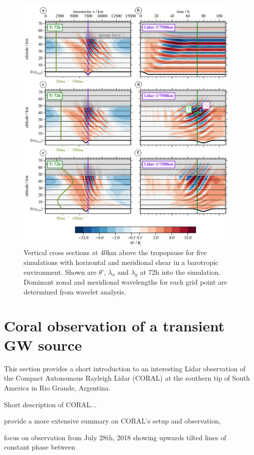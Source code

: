 \begin{figure}[tbp]
    \centering
    \includegraphics[width=0.99\textwidth]{figures_lidar/lidana_th.png}
    \caption{Vertical cross sections at 40km above the tropopause for five simulations with horizontal and meridional shear in a barotropic environment. Shown are $\theta$', $\lambda_x$ and $\lambda_y$ at 72h into the simulation. Dominant zonal and meridional wavelengths for each grid point are determined from wavelet analysis.}
\end{figure}


\section{Coral observation of a transient GW source}
\label{sec:lidOb-coral}

This section provides a short introduction to an interesting Lidar observation of the Compact Autonomous Rayleigh Lidar (CORAL) at the southern tip of South America in Rio Grande, Argentina. 

Short description of CORAL...

\textcite{kaifler_compact_2021} provide a more extensive summary on CORAL's setup and observation, 

focus on observation from July 28th, 2018 showing upwards tilted lines of constant phase between 


